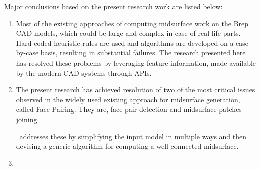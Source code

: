 Major conclusions based on the present research work are listed below: 
\begin{enumerate}
\item 
Most of the existing approaches of computing midsurface work on the Brep CAD models, which could be large and complex in case of real-life parts.  Hard-coded heuristic rules are used and algorithms are developed on a case-by-case basis, resulting in substantial failures. The research presented here has resolved these problems by leveraging feature information, made available by the modern CAD systems through APIs. 


\item

The present research has achieved resolution of two of the most critical issues observed in the widely used existing approach for midsurface generation, called Face Pairing. They are, face-pair detection and midsurface patches joining. 

\mysystemname~addresses these by simplifying the input model in multiple ways and then devising a generic algorithm for computing a well connected midsurface. 

\item


\end{enumerate}
